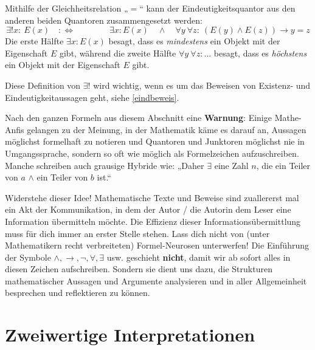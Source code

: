 \begin{bem} \label{eindquantzerlegung}
    Mithilfe der Gleichheitsrelation „$=$“ kann der Eindeutigkeitsquantor aus den anderen beiden Quantoren zusammengesetzt werden:
        \[ \exists ! x:\ E(x)\quad :\Leftrightarrow\qquad\qquad \exists x: E(x) \quad \land\quad \forall y\ \forall z:\ (E(y)\land E(z)) \to y=z \]
    Die erste Hälfte $\exists x: E(x)$ besagt, dass es \emph{mindestens} ein Objekt mit der Eigenschaft $E$ gibt, während die zweite Hälfte $\forall y\ \forall z:\dots$ besagt, dass es \emph{höchstens} ein Objekt mit der Eigenschaft $E$ gibt.
    
    Diese Definition von $\exists!$ wird wichtig, wenn es um das Beweisen von Existenz- und Eindeutigkeitaussagen geht, siehe \cref{eindbeweis}. 
\end{bem}


\begin{bem}
    Nach den ganzen Formeln aus diesem Abschnitt eine \textbf{Warnung}: Einige Mathe-Anfis gelangen zu der Meinung, in der Mathematik käme es darauf an, Aussagen möglichst formelhaft zu notieren und Quantoren und Junktoren möglichst nie in Umgangssprache, sondern so oft wie möglich als Formelzeichen aufzuschreiben. Manche schreiben auch grausige Hybride wie: „Daher $\exists$ eine Zahl $n$, die ein Teiler von $a$ $\land$ ein Teiler von $b$ ist.“
    
    Widerstehe dieser Idee! Mathematische Texte und Beweise sind zuallererst mal ein Akt der Kommunikation, in dem der Autor / die Autorin dem Leser eine Information übermitteln möchte. Die Effizienz dieser Informationsübermittlung muss für dich immer an erster Stelle stehen. Lass dich nicht von (unter Mathematikern recht verbreiteten) Formel-Neurosen unterwerfen! Die Einführung der Symbole $\land,\to,\neg,\forall,\exists$ usw. geschieht \textbf{nicht}, damit wir ab sofort alles in diesen Zeichen aufschreiben. Sondern sie dient uns dazu, die Strukturen mathematischer Aussagen und Argumente analysieren und in aller Allgemeinheit besprechen und reflektieren zu können.
\end{bem}





\section{Zweiwertige Interpretationen}


